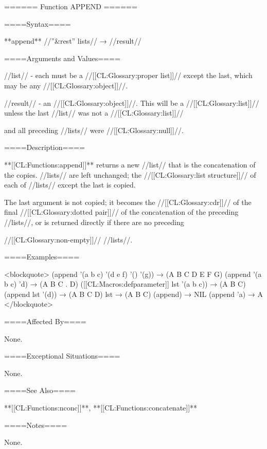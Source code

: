 ====== Function APPEND ======

====Syntax====

**append** //''&rest'' lists// → //result//

====Arguments and Values====

//list// - each must be a //[[CL:Glossary:proper list]]// except the last, which may be any //[[CL:Glossary:object]]//.

//result// - an //[[CL:Glossary:object]]//. This will be a //[[CL:Glossary:list]]// unless the last //list// was not a //[[CL:Glossary:list]]//

and all preceding //lists// were //[[CL:Glossary:null]]//.

====Description====

**[[CL:Functions:append]]** returns a new //list// that is the concatenation of the copies. //lists// are left unchanged; the //[[CL:Glossary:list structure]]// of each of //lists// except the last is copied.

The last argument is not copied; it becomes the //[[CL:Glossary:cdr]]// of the final //[[CL:Glossary:dotted pair]]// of the concatenation of the preceding //lists//, or is returned directly if there are no preceding

//[[CL:Glossary:non-empty]]// //lists//.

====Examples====

<blockquote> (append '(a b c) '(d e f) '() '(g)) → (A B C D E F G) (append '(a b c) 'd) → (A B C . D) ([[CL:Macros:defparameter]] lst '(a b c)) → (A B C) (append lst '(d)) → (A B C D) lst → (A B C) (append) → NIL (append 'a) → A </blockquote>

====Affected By====

None.

====Exceptional Situations====

None.

====See Also====

**[[CL:Functions:nconc]]**, **[[CL:Functions:concatenate]]**

====Notes====

None.

